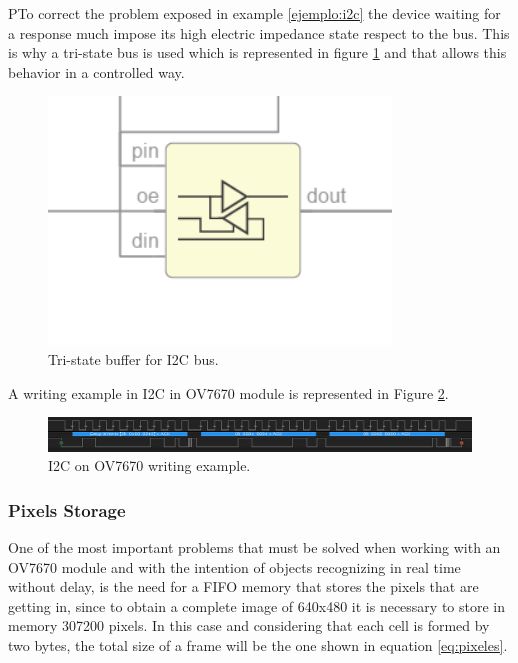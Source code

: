 PTo correct the problem exposed in example \ref{ejemplo:i2c} the device waiting for a response much impose its high electric impedance state respect to the bus. This is why a tri-state bus is used which is represented in figure \ref{fig:buffer_triestado} and that allows this behavior in a controlled way.
\begin{figure}[H]
	\center
	\includegraphics[scale=0.6, angle=0]{imagenes/Cuadricoptero_vision/triestado}
	\caption{Tri-state buffer for I2C bus.}
	\label{fig:buffer_triestado}
\end{figure}

A writing example in I2C in OV7670 module is represented in Figure \ref{fig:i2c_example}.

\begin{figure}[H]
	\center
	\includegraphics[scale=0.4, angle=0]{imagenes/Cuadricoptero_vision/i2c_example}
	\caption{I2C on OV7670 writing example.}
	\label{fig:i2c_example}
\end{figure}

\subsubsection{Pixels Storage}

One of the most important problems that must be solved when working with an OV7670 module and with the intention of objects recognizing in real time without delay, is the need for a FIFO memory that stores the pixels that are getting in, since to obtain a complete image of 640x480 it is necessary to store in memory 307200 pixels. In this case and considering that each cell is formed by two bytes, the total size of a frame will be the one shown in equation \ref{eq:pixeles}.

